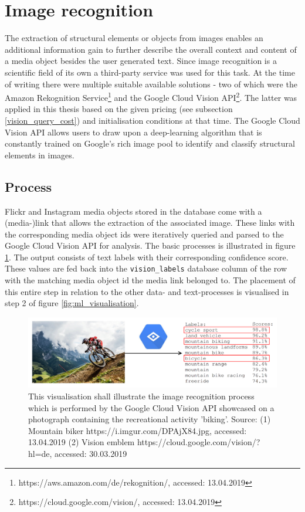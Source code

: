 \section{Image recognition} \label{image_recognition}
The extraction of structural elements or objects from images enables an additional information gain to further describe the overall context and content of a media object besides the user generated text. Since image recognition is a scientific field of its own a third-party service was used for this task. At the time of writing there were multiple suitable available solutions - two of which were the Amazon Rekognition Service\footnote{https://aws.amazon.com/de/rekognition/, accessed: 13.04.2019} and the Google Cloud Vision API\footnote{https://cloud.google.com/vision/, accessed: 13.04.2019}. The latter was applied in this thesis based on the given pricing (see subsection \ref{vision_query_cost}) and initialisation conditions at that time. The Google Cloud Vision API allows users to draw upon a deep-learning algorithm that is constantly trained on Google's rich image pool to identify and classify structural elements in images.

\subsection{Process}
Flickr and Instagram media objects stored in the database come with a (media-)link that allows the extraction of the associated image. These links with the corresponding media object ids were iteratively queried and parsed to the Google Cloud Vision API for analysis. The basic processes is illustrated in figure \ref{fig:vision_illustration}. The output consists of text labels with their corresponding confidence score. These values are fed back into the \texttt{vision\_labels} database column of the row with the matching media object id the media link belonged to. The placement of this entire step in relation to the other data- and text-processes is visualised in step 2 of figure \ref{fig:ml_visualisation}.

\begin{figure}[h!]
\centering
\includegraphics[width=\textwidth]{img/vision_illustration}
\caption{This visualisation shall illustrate the image recognition process which is performed by the Google Cloud Vision API showcased on a photograph containing the recreational activity 'biking'. Source: (1) Mountain biker https://i.imgur.com/DPAjX84.jpg, accessed: 13.04.2019 (2) Vision emblem https://cloud.google.com/vision/?hl=de, accessed: 30.03.2019}
\label{fig:vision_illustration}
\end{figure}

